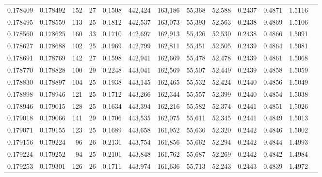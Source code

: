 \begin{tabular}{rrrrrrrrrrrrr}
0.178409 & 0.178492 & 152 &  27 &                                     0.1508 & 442,424 & 163,186 &  55,368 &  52,588 & 0.2437 & 0.4871 & 1.5116 \\
0.178495 & 0.178559 & 113 &  25 &                                     0.1812 & 442,537 & 163,073 &  55,393 &  52,563 & 0.2438 & 0.4869 & 1.5106 \\
0.178560 & 0.178625 & 160 &  33 &                                     0.1710 & 442,697 & 162,913 &  55,426 &  52,530 & 0.2438 & 0.4866 & 1.5091 \\
0.178627 & 0.178688 & 102 &  25 &                                     0.1969 & 442,799 & 162,811 &  55,451 &  52,505 & 0.2439 & 0.4864 & 1.5081 \\
0.178691 & 0.178769 & 142 &  27 &                                     0.1598 & 442,941 & 162,669 &  55,478 &  52,478 & 0.2439 & 0.4861 & 1.5068 \\
0.178770 & 0.178828 & 100 &  29 &                                     0.2248 & 443,041 & 162,569 &  55,507 &  52,449 & 0.2439 & 0.4858 & 1.5059 \\
0.178830 & 0.178897 & 104 &  25 &                                     0.1938 & 443,145 & 162,465 &  55,532 &  52,424 & 0.2440 & 0.4856 & 1.5049 \\
0.178898 & 0.178946 & 121 &  25 &                                     0.1712 & 443,266 & 162,344 &  55,557 &  52,399 & 0.2440 & 0.4854 & 1.5038 \\
0.178946 & 0.179015 & 128 &  25 &                                     0.1634 & 443,394 & 162,216 &  55,582 &  52,374 & 0.2441 & 0.4851 & 1.5026 \\
0.179018 & 0.179066 & 141 &  29 &                                     0.1706 & 443,535 & 162,075 &  55,611 &  52,345 & 0.2441 & 0.4849 & 1.5013 \\
0.179071 & 0.179155 & 123 &  25 &                                     0.1689 & 443,658 & 161,952 &  55,636 &  52,320 & 0.2442 & 0.4846 & 1.5002 \\
0.179156 & 0.179224 &  96 &  26 &                                     0.2131 & 443,754 & 161,856 &  55,662 &  52,294 & 0.2442 & 0.4844 & 1.4993 \\
0.179224 & 0.179252 &  94 &  25 &                                     0.2101 & 443,848 & 161,762 &  55,687 &  52,269 & 0.2442 & 0.4842 & 1.4984 \\
0.179253 & 0.179301 & 126 &  26 &                                     0.1711 & 443,974 & 161,636 &  55,713 &  52,243 & 0.2443 & 0.4839 & 1.4972 \\

\end{tabular}
